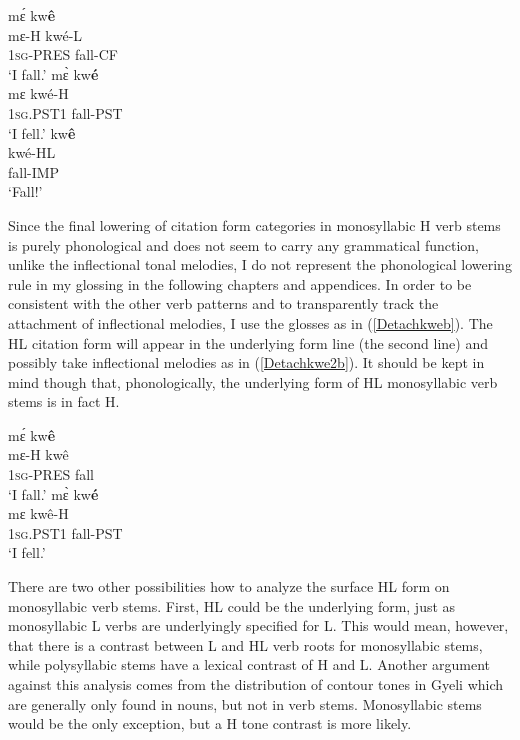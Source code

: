 \begin{exe} 
\ex\label{Detachkwe}
\begin{xlist}
\ex\label{Detachkwe1} 
  \glll     mɛ́ kw{\bfseries ê} \\
	mɛ-H kwé-L \\	
            1\textsc{sg}-PRES fall-CF     \\
    \trans `I fall.'
\ex\label{Detachkwe2}
  \glll    mɛ̀ kw{\bfseries é} \\
	mɛ kwé-H \\	
            1\textsc{sg}.PST1 fall-PST     \\
    \trans `I fell.'
\ex\label{Detachkwe3}
  \glll   kw{\bfseries ê} \\
	kwé-HL \\	
            fall-IMP     \\
    \trans `Fall!'
\end{xlist}
\end{exe}

Since the final lowering of citation form categories in monosyllabic H verb stems is purely phonological  and does not seem to carry any grammatical function, unlike the inflectional tonal melodies, I do not represent the phonological lowering rule in my glossing in the following chapters and appendices.  In order to be consistent with the other verb patterns and to transparently track the attachment of inflectional melodies, I use the glosses as in (\ref{Detachkweb}). The HL citation form will appear in the underlying form line (the second line) and possibly take inflectional melodies as in (\ref{Detachkwe2b}). It should be kept in mind though that, phonologically, the underlying form of HL monosyllabic verb stems is in fact H.


\begin{exe} 
\ex\label{Detachkweb}
\begin{xlist}
\ex\label{Detachkwe1b} 
  \glll     mɛ́ kw{\bfseries ê} \\
	mɛ-H kwê \\	
            1\textsc{sg}-PRES fall     \\
    \trans `I fall.'
\ex\label{Detachkwe2b}
  \glll    mɛ̀ kw{\bfseries é} \\
	mɛ kwê-H \\	
            1\textsc{sg}.PST1 fall-PST     \\
    \trans `I fell.'
\end{xlist}
\end{exe}

There are two other possibilities how to analyze the surface HL form on monosyllabic verb stems. First, HL  could be the underlying form, just as monosyllabic L verbs are underlyingly specified for L. This would mean, however, that there is a contrast between L and HL verb roots for monosyllabic stems, while polysyllabic stems have a lexical contrast of H and L. Another argument against this analysis comes from the distribution of contour tones in Gyeli which are generally only found in nouns, but not in verb stems. Monosyllabic stems would be the only exception, but a H tone contrast is more likely.


